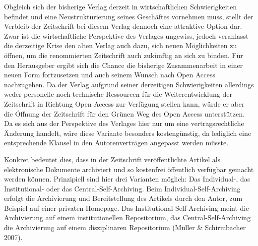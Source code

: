\documentclass[a4paper,
fontsize=11pt,
oneside,
numbers=noperiodatend,
parskip=half-,
bibliography=totoc,
final
]{scrartcl}
\begin{document}
Obgleich sich der bisherige Verlag derzeit in wirtschaftlichen
Schwierigkeiten befindet und eine Neustrukturierung seines Geschäftes
vornehmen muss, stellt der Verbleib der Zeitschrift bei diesem Verlag
dennoch eine attraktive Option dar. Zwar ist die wirtschaftliche
Perspektive des Verlages ungewiss, jedoch veranlasst die derzeitige
Krise den alten Verlag auch dazu, sich neuen Möglichkeiten zu öffnen, um
die renommierten Zeitschrift auch zukünftig an sich zu binden. Für den
Herausgeber ergibt sich die Chance die bisherige Zusammenarbeit in einer
neuen Form fortzusetzen und auch seinem Wunsch nach Open Access
nachzugehen. Da der Verlag aufgrund seiner derzeitigen Schwierigkeiten
allerdings weder personelle noch technische Ressourcen für die
Weiterentwicklung der Zeitschrift in Richtung Open Access zur Verfügung
stellen kann, würde er aber die Öffnung der Zeitschrift für den Grünen
Weg des Open Access unterstützen. Da es sich aus der Perspektive des
Verlages hier nur um eine vertragsrechtliche Änderung handelt, wäre
diese Variante besonders kostengünstig, da lediglich eine entsprechende
Klausel in den Autorenverträgen angepasst werden müsste.

Konkret bedeutet dies, dass in der Zeitschrift veröffentlichte Artikel
als elektronische Dokumente archiviert und so kostenfrei öffentlich
verfügbar gemacht werden können. Prinzipiell sind hier drei Varianten
möglich: Das Individual-, das Institutional- oder das
Central-Self-Archiving. Beim Individual-Self-Archiving erfolgt die
Archivierung und Bereitstellung des Artikels durch den Autor, zum
Beispiel auf einer privaten Homepage. Das Institutional-Self-Archiving
meint die Archivierung auf einem institutionellen Repositorium, das
Central-Self-Archiving die Archivierung auf einem disziplinären
Repositorium (Müller \& Schirmbacher 2007).
\end{document}
